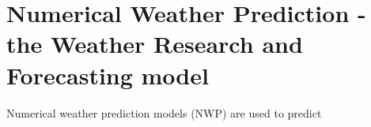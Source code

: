 %
%

\section{Numerical Weather Prediction - the Weather Research and Forecasting model}
\label{WRF}

Numerical weather prediction models (NWP) are used to predict 
